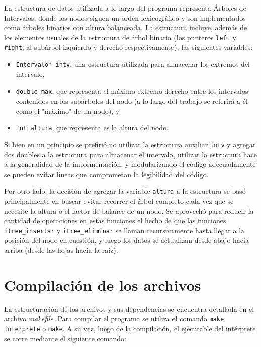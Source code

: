 \documentclass[11pt]{article}
\begin{document}
 La estructura de datos utilizada a lo largo del programa representa Árboles de Intervalos, donde los nodos siguen un orden lexicográfico y son implementados como árboles binarios con altura balanceada.
 La estructura incluye, además de los elementos usuales de la estructura de árbol binario (los punteros \verb|left| y \verb|right|, al subárbol izquierdo y derecho respectivamente), 
 las siguientes variables:
 \begin{itemize}
     \item \verb|Intervalo* intv|, una estructura utilizada para almacenar los extremos del intervalo,
     \item \verb|double max|, que representa el máximo extremo derecho entre los intervalos contenidos en los subárboles del nodo (a lo largo del trabajo se referirá a él como el "máximo" de un nodo), y
     \item \verb|int altura|, que representa es la altura del nodo.
 \end{itemize} \par
 
 Si bien en un principio se prefirió no utilizar la estructura auxiliar \verb|intv| y agregar dos doubles a la estructura para almacenar el intervalo, utilizar la estructura hace a la generalidad de la implementación, y modularizando el código adecuadamente se pueden evitar líneas que comprometan la legibilidad del código. \par

 Por otro lado, la decisión de agregar la variable \verb|altura| a la estructura se basó principalmente en buscar evitar recorrer el árbol completo cada vez que se necesite la altura o el factor de balance de un nodo. Se aprovechó para reducir la cantidad de operaciones en estas funciones el hecho de que las funciones \verb|itree_insertar| y \verb|itree_eliminar| se llaman recursivamente hasta llegar a la posición del nodo en cuestión, y luego los datos se actualizan desde abajo hacia arriba (desde las hojas hacia la raíz). \par
 
 
 \section{Compilación de los archivos}
 
 La estructuración de los archivos y sus dependencias se encuentra detallada en el archivo \textit{makefile}. 
 Para compilar el programa se utiliza el comando \verb|make interprete| o \verb|make|. A su vez, luego de la compilación, el ejecutable del intérprete se corre mediante el siguiente comando:\par
 
\end{document}
